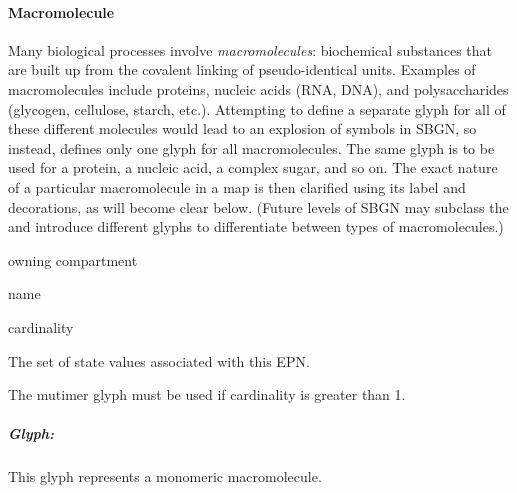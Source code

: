 
\paragraph{Macromolecule}
\label{sec:macromolecule}

Many biological processes involve \emph{macromolecules}: biochemical substances that are built up from the covalent linking of pseudo-identical units.  Examples of macromolecules include proteins, nucleic acids (RNA, DNA), and polysaccharides (glycogen, cellulose, starch, etc.).  Attempting to define a separate glyph for all of these different molecules would lead to an explosion of symbols in SBGN, so instead, \SBGNPDLone defines only one glyph for all macromolecules.  The same glyph is to be used for a protein, a nucleic acid, a complex sugar, and so on.  The exact nature of a particular macromolecule in a map is then clarified using its label and decorations, as will become clear below.  (Future levels of SBGN may subclass the  and introduce different glyphs to differentiate between types of macromolecules.)

\begin{glyphDescription}
 \begin{glyphIdentity}
  \item owning compartment
  \item name
  \item cardinality
  \item The set of state values associated with this EPN.
  \end{glyphIdentity}
  \glyphRules The mutimer glyph
  must be used if cardinality is greater than 1.
\end{glyphDescription}

\subparagraph{Glyph: }

This glyph represents a monomeric macromolecule.


